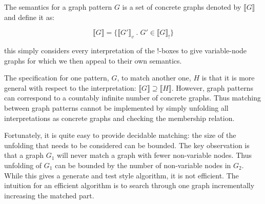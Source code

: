 \documentclass[runningheads]{llncs}
\newcommand{\vinterp}[1]{\llbracket #1 \rrbracket_v}
\newcommand{\binterp}[1]{\llbracket #1 \rrbracket_!}
\newcommand{\minterp}[1]{\llbracket #1 \rrbracket}
\begin{document}




The semantics for a graph
pattern $G$ is a set of concrete graphs denoted by $\minterp{G}$ and
define it as:

$$\minterp{G} = \{\vinterp{G'}\;.\; G' \in \binterp{G}\}$$

\noindent this simply considers every interpretation of the !-boxes to
give variable-node graphs for which we then appeal to their own
semantics. 

The specification for one pattern,
$G$, to match another one, $H$ is that it is more general with respect
to the interpretation: $\minterp{G} \supseteq \minterp{H}$. However,
graph patterns can correspond to a countably infinite number of
concrete graphs. Thus matching between graph patterns cannot be
implemented by simply unfolding all interpretations as concrete graphs
and checking the membership relation.

Fortunately, it is quite easy to provide decidable matching: the size
of the unfolding that needs to be considered can be bounded. The key
observation is that a graph $G_1$ will never match a graph with fewer
non-variable nodes. Thus unfolding of $G_1$ can be bounded by the
number of non-variable nodes in $G_2$. While this gives a generate and
test style algorithm, it is not efficient. The intuition for an
efficient algorithm is to search through one graph incrementally
increasing the matched part.  
\end{document}
